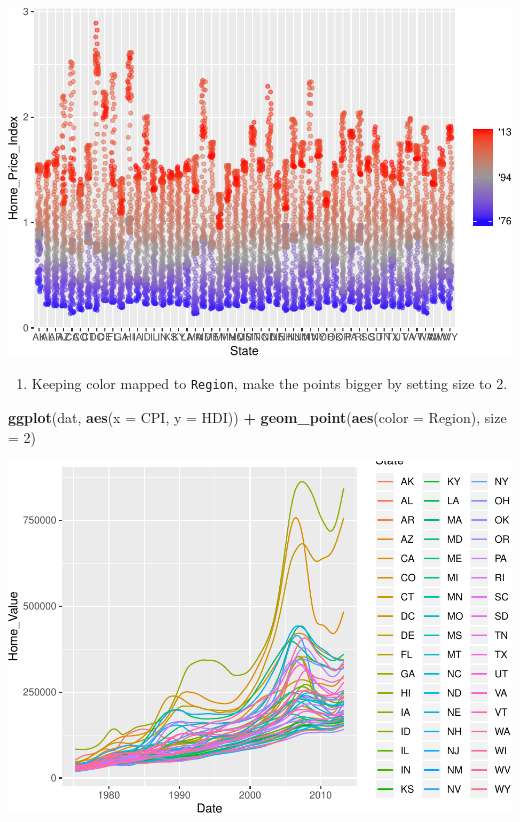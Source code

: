 \documentclass[
]{book}
\newenvironment{Shaded}{\begin{snugshade}}{\end{snugshade}}
\newcommand{\DataTypeTok}[1]{\textcolor[rgb]{0.13,0.29,0.53}{#1}}
\newcommand{\DecValTok}[1]{\textcolor[rgb]{0.00,0.00,0.81}{#1}}
\newcommand{\KeywordTok}[1]{\textcolor[rgb]{0.13,0.29,0.53}{\textbf{#1}}}
\newcommand{\NormalTok}[1]{#1}
\newcommand{\OperatorTok}[1]{\textcolor[rgb]{0.81,0.36,0.00}{\textbf{#1}}}
\newcommand{\StringTok}[1]{\textcolor[rgb]{0.31,0.60,0.02}{#1}}
\providecommand{\tightlist}{%
  \setlength{\itemsep}{0pt}\setlength{\parskip}{0pt}}
\begin{document}
\includegraphics{R/Rgraphics/figures/unnamed-chunk-176-1.pdf}

\begin{enumerate}
\def\labelenumi{\arabic{enumi}.}
\setcounter{enumi}{3}
\tightlist
\item
  Keeping color mapped to \texttt{Region}, make the points bigger by setting size to 2.
\end{enumerate}

\begin{Shaded}
\begin{Highlighting}[]
\KeywordTok{ggplot}\NormalTok{(dat, }\KeywordTok{aes}\NormalTok{(}\DataTypeTok{x =}\NormalTok{ CPI, }\DataTypeTok{y =}\NormalTok{ HDI)) }\OperatorTok{+}
\StringTok{  }\KeywordTok{geom\_point}\NormalTok{(}\KeywordTok{aes}\NormalTok{(}\DataTypeTok{color =}\NormalTok{ Region), }\DataTypeTok{size =} \DecValTok{2}\NormalTok{)}
\end{Highlighting}
\end{Shaded}

\includegraphics{R/Rgraphics/figures/unnamed-chunk-177-1.pdf}
\end{document}
